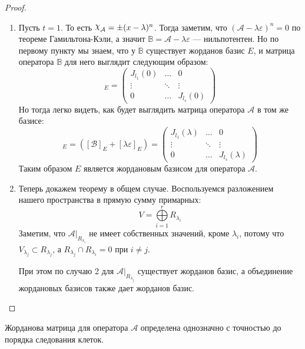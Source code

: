 \documentclass[../main.tex]{subfiles}
\begin{document}
\begin{proof}
\begin{enumerate}
    \item Пусть $t = 1$. То есть $\rchi_{\mathcal{A}} = \pm (x - \lambda)^n$. Тогда заметим, что $(\mathcal{A} - \lambda \varepsilon)^n = 0$ по теореме Гамильтона-Кэли, а значит $\mathbb{B} = \mathcal{A} - \lambda \varepsilon$ --- нильпотентен. Но по первому пункту мы знаем, что у $\mathbb{B}$ существует жорданов базис $E$, и матрица оператора $\mathbb{B}$ для него выглядит следующим образом:
    \begin{equation*}
      [\mathbb{B}]_E
      =
      \begin{pmatrix}
        J_{l_1}(0) & \hdots & 0 \\
        \vdots & \ddots & \vdots \\
        0 & \hdots & J_{l_s}(0)
      \end{pmatrix}
    \end{equation*}
    Но тогда легко видеть, как будет выглядить матрица оператора $\mathcal{A}$ в том же базисе:
    \begin{equation*}
      [\mathcal{A}]_E
      =
      ([\mathcal{B}]_E + [\lambda \varepsilon]_E)
      =
      \begin{pmatrix}
        J_{l_1}(\lambda) & \hdots & 0 \\
        \vdots & \ddots & \vdots \\
        0 & \hdots & J_{l_s}(\lambda)
      \end{pmatrix}
    \end{equation*}
    Таким образом $E$ является жордановым базисом для оператора $\mathcal{A}$.

    \item Теперь докажем теорему в общем случае.
    Воспользуемся разложением нашего пространства в прямую сумму примарных:
    \begin{equation*}
      V = \bigoplus\limits_{i = 1}^{r} R_{\lambda_i}
    \end{equation*}
    Заметим, что $\mathcal{A} |_{R_{\lambda_i}}$ не имеет собственных значений, кроме $\lambda_i$, потому что $V_{\lambda_j} \subset R_{\lambda_j}$, а $R_{\lambda_j} \cap R_{\lambda_i} = 0$ при $i \neq j$.

    При этом по случаю 2 для $\mathcal{A}|_{R_{\lambda_j}}$ существует жорданов базис, а объединение жордановых базисов также дает жорданов базис.
  \end{enumerate}
\end{proof}

\begin{remark}
  Жорданова матрица для оператора $\mathcal{A}$ определена однозначно с точностью до порядка следования клеток.
\end{remark}
\end{document}

